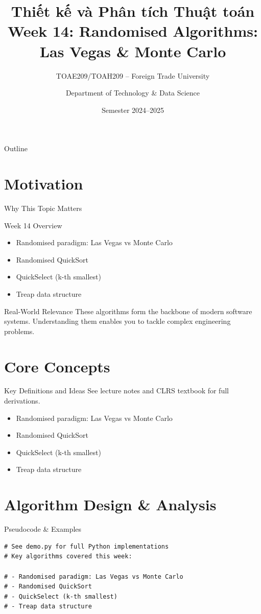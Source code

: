 \documentclass[aspectratio=169,xcolor=dvipsnames]{beamer}
\title[Algorithms -- Week 14]{\textbf{Thiết kế và Phân tích Thuật toán}\\
  \large Week 14: Randomised Algorithms: Las Vegas & Monte Carlo}
\subtitle{TOAE209/TOAH209 -- Foreign Trade University}
\author{Department of Technology \& Data Science}
\date{Semester 2024--2025}
\begin{document}
\begin{frame}\titlepage\end{frame}
\begin{frame}{Outline}\tableofcontents\end{frame}

\section{Motivation}
\begin{frame}{Why This Topic Matters}
  \begin{block}{Week 14 Overview}
    \begin{itemize}
    \item Randomised paradigm: Las Vegas vs Monte Carlo
    \item Randomised QuickSort
    \item QuickSelect (k-th smallest)
    \item Treap data structure
    \end{itemize}
  \end{block}
  \begin{exampleblock}{Real-World Relevance}
    These algorithms form the backbone of modern software systems.
    Understanding them enables you to tackle complex engineering problems.
  \end{exampleblock}
\end{frame}

\section{Core Concepts}
\begin{frame}{Key Definitions and Ideas}
  See lecture notes and CLRS textbook for full derivations.
  \begin{itemize}
    \item Randomised paradigm: Las Vegas vs Monte Carlo
    \item Randomised QuickSort
    \item QuickSelect (k-th smallest)
    \item Treap data structure
  \end{itemize}
\end{frame}

\section{Algorithm Design \& Analysis}
\begin{frame}[fragile]{Pseudocode \& Examples}
  \begin{lstlisting}
# See demo.py for full Python implementations
# Key algorithms covered this week:

# - Randomised paradigm: Las Vegas vs Monte Carlo
# - Randomised QuickSort
# - QuickSelect (k-th smallest)
# - Treap data structure
  \end{lstlisting}
\end{frame}
\end{document}
